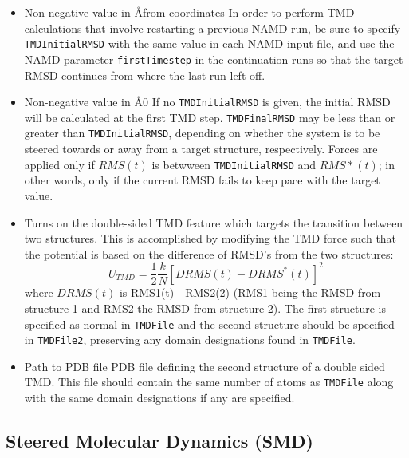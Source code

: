 \begin{itemize}
\item
{}
{Non-negative value in \AA}{from coordinates}{
In order to perform TMD calculations that involve restarting a previous
NAMD run, be sure to specify {\tt TMDInitialRMSD} with the same value
in each NAMD input file, and use the NAMD parameter {\tt firstTimestep}
in the continuation runs so that the target RMSD continues from where the
last run left off.
}
\item
{}
{Non-negative value in \AA}{0}
{If no {\tt TMDInitialRMSD} is given, the initial RMSD will be calculated at the
first TMD step.  {\tt TMDFinalRMSD} may be less than or greater than
{\tt TMDInitialRMSD}, depending on whether the system is to be steered 
towards or away from a target structure, respectively.  Forces are applied
only if $RMS(t)$ is betwween {\tt TMDInitialRMSD} and $RMS*(t)$; in other
words, only if the current RMSD fails to keep pace with the target value.}

\item
{}
{Turns on the double-sided TMD feature which targets the transition between two structures. 
This is accomplished by modifying the TMD force such that the potential is based on the
difference of RMSD's from the two structures:
\begin{equation}
U_{TMD} = \frac{1}{2} \frac{k}{N} \left[ DRMS(t) - DRMS^*(t) \right]^2
\label{eq:dstmdpotential}
\end{equation}
where $DRMS(t)$ is RMS1(t) - RMS2(2) (RMS1 being the RMSD from structure 1 and RMS2 the RMSD from structure 2).
The first structure is specified as normal in {\tt TMDFile} and the second structure should
be specified in {\tt TMDFile2}, preserving any domain designations found in {\tt TMDFile}. 
}

\item
{}
{Path to PDB file}
{PDB file defining the second structure of a double sided TMD. This file
should contain the same number of atoms as {\tt TMDFile} along with the 
same domain designations if any are specified.
}

\end{itemize}

\subsection{Steered Molecular Dynamics (SMD)}

